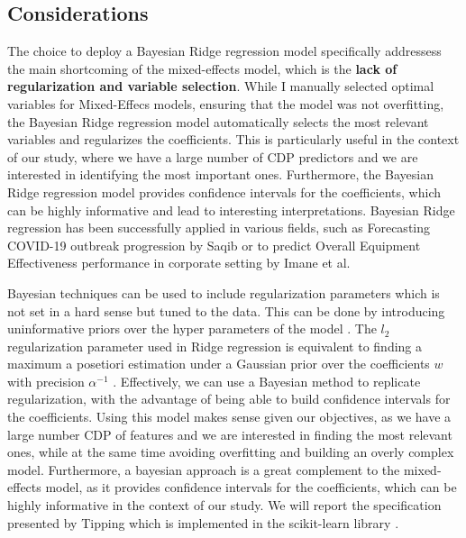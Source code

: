 \subsection{Considerations}
The choice to deploy a Bayesian Ridge regression model specifically addressess the main shortcoming of the mixed-effects model, which is the \textbf{lack of regularization and variable selection}. While I manually selected optimal variables for Mixed-Effecs models, ensuring that the model was not overfitting, the Bayesian Ridge regression model automatically selects the most relevant variables and regularizes the coefficients. This is particularly useful in the context of our study, where we have a large number of CDP predictors and we are interested in identifying the most important ones. Furthermore, the Bayesian Ridge regression model provides confidence intervals for the coefficients, which can be highly informative and lead to interesting interpretations. Bayesian Ridge regression has been successfully applied in various fields, such as Forecasting COVID-19 outbreak progression by Saqib \cite{saqib} or to predict Overall Equipment Effectiveness performance in corporate setting by Imane et al. \cite{imane}

Bayesian techniques can be used to include regularization parameters which is not set in a hard sense but tuned to the data. This can be done by introducing uninformative priors over the hyper parameters of the model \cite{scikit-learn, mackay_bayesian_1992}. The $l_2$ regularization parameter used in Ridge regression is equivalent to finding a maximum a posetiori estimation under a Gaussian prior over the coefficients $w$ with precision $\alpha^{-1}$ \cite{scikit-learn}. Effectively, we can use a Bayesian method to replicate regularization, with the advantage of being able to build confidence intervals for the coefficients. Using this model makes sense given our objectives, as we have a large number CDP of features and we are interested in finding the most relevant ones, while at the same time avoiding overfitting and building an overly complex model. Furthermore, a bayesian approach is a great complement to the mixed-effects model, as it provides confidence intervals for the coefficients, which can be highly informative in the context of our study. We will report the specification presented by Tipping \cite{tipping} which is implemented in the scikit-learn library \cite{scikit-learn}.

